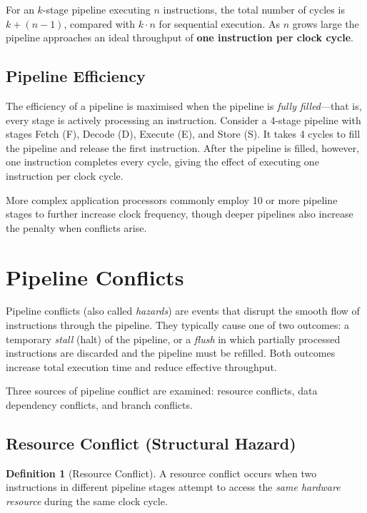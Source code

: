 \documentclass[11pt, a4paper, notitlepage]{report}
\theoremstyle{definition}
\newtheorem{definition}[theorem]{Definition}
\theoremstyle{remark}
\theoremstyle{definition}
\begin{document}
\begin{keyresult}[title={Key Result: Pipeline Speedup}]
  For an $k$-stage pipeline executing $n$ instructions, the total number of cycles is $k + (n - 1)$, compared with $k \cdot n$ for sequential execution. As $n$ grows large the pipeline approaches an ideal throughput of \textbf{one instruction per clock cycle}.
\end{keyresult}

\subsection{Pipeline Efficiency}
\label{sec:pipeline-efficiency}

The efficiency of a pipeline is maximised when the pipeline is \emph{fully filled}---that is, every stage is actively processing an instruction. Consider a 4-stage pipeline with stages Fetch (F), Decode (D), Execute (E), and Store (S). It takes 4 cycles to fill the pipeline and release the first instruction. After the pipeline is filled, however, one instruction completes every cycle, giving the effect of executing one instruction per clock cycle.

More complex application processors commonly employ 10 or more pipeline stages to further increase clock frequency, though deeper pipelines also increase the penalty when conflicts arise.

\section{Pipeline Conflicts}
\label{sec:pipeline-conflicts}

Pipeline conflicts (also called \emph{hazards}) are events that disrupt the smooth flow of instructions through the pipeline. They typically cause one of two outcomes: a temporary \emph{stall} (halt) of the pipeline, or a \emph{flush} in which partially processed instructions are discarded and the pipeline must be refilled. Both outcomes increase total execution time and reduce effective throughput.

Three sources of pipeline conflict are examined: resource conflicts, data dependency conflicts, and branch conflicts.

\subsection{Resource Conflict (Structural Hazard)}
\label{sec:resource-conflict}

\begin{definition}[Resource Conflict]
\label{def:resource-conflict}
  A resource conflict occurs when two instructions in different pipeline stages attempt to access the \emph{same hardware resource} during the same clock cycle.
\end{definition}
\end{document}
